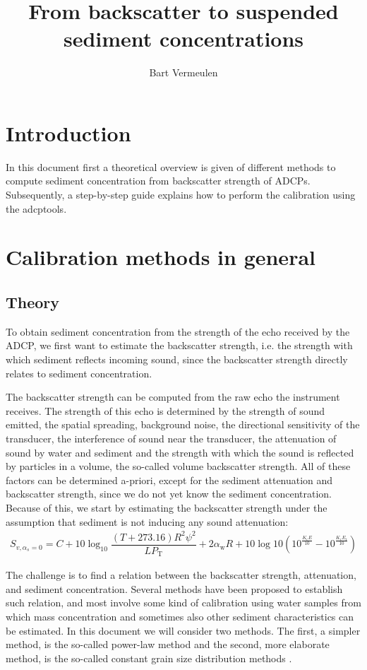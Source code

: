 \documentclass[]{article}
\title{From backscatter to suspended sediment concentrations}
\author{Bart Vermeulen}
\begin{document}
\maketitle
\tableofcontents
\section{Introduction}
In this document first a theoretical overview is given of different methods to compute sediment concentration from backscatter strength of ADCPs. Subsequently, a step-by-step guide explains how to perform the calibration using the adcptools.

\section{Calibration methods in general}
\subsection{Theory}
\label{sec:general_theory}
To obtain sediment concentration from the strength of the echo received by the ADCP, we first want to estimate the backscatter strength, i.e. the strength with which sediment reflects incoming sound, since the backscatter strength directly relates to sediment concentration. 

The backscatter strength can be computed from the raw echo the instrument receives. The strength of this echo is determined by the strength of sound emitted, the spatial spreading, background noise, the directional sensitivity of the transducer, the interference of sound near the transducer, the attenuation of sound by water and sediment and the strength with which the sound is reflected by particles in a volume, the so-called volume backscatter strength.  All of these factors can be determined a-priori, except for the sediment attenuation and backscatter strength, since we do not yet know the sediment concentration. Because of this, we start by estimating the backscatter strength under the assumption that sediment is not inducing any sound attenuation:
\begin{align}
  S_{v,\alpha_s=0}= C + 10\log_{10}\dfrac{(T+273.16)R^2 \psi^2}{LP_\text{T}}  + 2\alpha_\text{w}R + 10\log10\left(10^{\frac{K_\text{c}E}{10}}-10^{\frac{K_\text{c}E_\text{r}}{10}}\right)
\end{align}

The challenge is to find a relation between the backscatter strength, attenuation, and sediment concentration. Several methods have been proposed to establish such relation, and most involve some kind of calibration using water samples from which mass concentration and sometimes also other sediment characteristics can be estimated.
In this document we will consider two methods. The first, a simpler method, is the so-called power-law method \citep{hoitink2005} and the second, more elaborate method, is the so-called constant grain size distribution methods \citep{sassi2012}.
\end{document}
